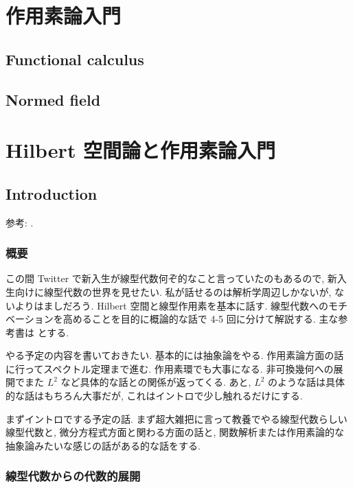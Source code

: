 \documentclass[openany, a4paper, oneside]{jsbook}
\theoremstyle{break}
\theoremstyle{breakdefn}
\begin{document}
\chapter{作用素論入門}

\section{Functional calculus}

\section{Normed field}

\chapter{Hilbert 空間論と作用素論入門}

\section{Introduction}


参考: \cite{KazuhikoAomoto1, AraiEzawa1, AraiEzawa2, AsaoArai4, HaimBrezis1,
HaimBrezis2, HiaiYanagi1, KenichiKanaya1, NaokiKurasawa1,
TomKoornwinder1, SeikiNishikawa1, NatsumeMoriyoshi1,
NoborizakaOnishiYamamoto1, MakotoOkazaki1, KimYamamoto1, HiroshiTanaka1}.
\subsection{概要}


この間 Twitter で新入生が線型代数何ぞ的なこと言っていたのもあるので,
新入生向けに線型代数の世界を見せたい.
私が話せるのは解析学周辺しかないが, ないよりはましだろう.
Hilbert 空間と線型作用素を基本に話す.
線型代数へのモチベーションを高めることを目的に概論的な話で 4-5 回に分けて解説する.
主な参考書は \cite{HiaiYanagi1, AraiEzawa1, AraiEzawa2} とする.

やる予定の内容を書いておきたい.
基本的には抽象論をやる.
作用素論方面の話に行ってスペクトル定理まで進む.
作用素環でも大事になる.
非可換幾何への展開でまた $L^2$ など具体的な話との関係が返ってくる.
あと, $L^2$ のような話は具体的な話はもちろん大事だが, これはイントロで少し触れるだけにする.

まずイントロでする予定の話.
まず超大雑把に言って教養でやる線型代数らしい線型代数と,
微分方程式方面と関わる方面の話と, 関数解析または作用素論的な抽象論みたいな感じの話がある的な話をする.
\subsection{線型代数からの代数的展開}
\end{document}
